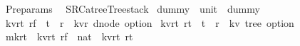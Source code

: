 %
\begin{isabellebody}%
%
%
\isadelimtheory
%
\endisadelimtheory
%
\isatagtheory
{}\isamarkupfalse%
\ Pre{\isacharunderscore}params\isanewline
{}\ \ {\isachardoublequoteopen}{\isachardollar}SRC{\isacharslash}a{\isacharunderscore}tree{\isacharslash}Tree{\isacharunderscore}stack{\isachardoublequoteclose}\isanewline
{}%
\endisatagtheory
{\isafoldtheory}%
%
\isadelimtheory
\isanewline
%
\endisadelimtheory
\isanewline
\isanewline
{}\isamarkupfalse%
\ dummy\ {\isacharcolon}{\isacharcolon}\ {\isachardoublequoteopen}unit{\isachardoublequoteclose}\ \ {\isachardoublequoteopen}dummy{\isacharequal}{\isacharparenleft}{\isacharparenright}{\isachardoublequoteclose}\isanewline
\isanewline
\isanewline
\isanewline
\isanewline
\isanewline
{}\isamarkupfalse%
\ {\isacharparenleft}{\isacharprime}k{\isacharcomma}{\isacharprime}v{\isacharcomma}{\isacharprime}r{\isacharcomma}{\isacharprime}t{\isacharparenright}\ r{}f\ {\isacharequal}\ {\isachardoublequoteopen}{\isacharparenleft}{\isacharprime}t\ {\isasymRightarrow}\ {\isacharprime}r\ {\isasymRightarrow}\ {\isacharparenleft}{\isacharprime}k{\isacharcomma}{\isacharprime}v{\isacharcomma}{\isacharprime}r{\isacharparenright}\ dnode\ option{\isacharparenright}{\isachardoublequoteclose}\isanewline
\isanewline
{}\isamarkupfalse%
\ {\isacharparenleft}{\isacharprime}k{\isacharcomma}{\isacharprime}v{\isacharcomma}{\isacharprime}r{\isacharcomma}{\isacharprime}t{\isacharparenright}\ r{}t\ {\isacharequal}\ {\isachardoublequoteopen}{\isacharparenleft}{\isacharprime}t\ {\isasymRightarrow}\ {\isacharprime}r\ {\isasymRightarrow}\ {\isacharparenleft}{\isacharprime}k{\isacharcomma}{\isacharprime}v{\isacharparenright}\ tree\ option{\isacharparenright}{\isachardoublequoteclose}\isanewline
\isanewline
\isanewline
{}\isamarkupfalse%
\ mk{\isacharunderscore}r{}t{\isacharprime}\ {\isacharcolon}{\isacharcolon}\ {\isachardoublequoteopen}{\isacharparenleft}{\isacharprime}k{\isacharcomma}{\isacharprime}v{\isacharcomma}{\isacharprime}r{\isacharcomma}{\isacharprime}t{\isacharparenright}\ r{}f\ {\isasymRightarrow}\ nat\ {\isasymRightarrow}\ {\isacharparenleft}{\isacharprime}k{\isacharcomma}{\isacharprime}v{\isacharcomma}{\isacharprime}r{\isacharcomma}{\isacharprime}t{\isacharparenright}\ r{}t{\isachardoublequoteclose}\ \isanewline

\end{isabellebody}
